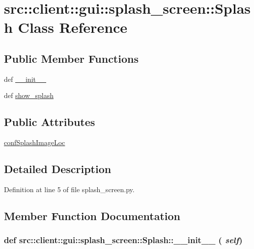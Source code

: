 \hypertarget{classsrc_1_1client_1_1gui_1_1splash__screen_1_1Splash}{
\section{src::client::gui::splash\_\-screen::Splash Class Reference}
\label{classsrc_1_1client_1_1gui_1_1splash__screen_1_1Splash}
}
\subsection*{Public Member Functions}
\begin{DoxyCompactItemize}
\item 
def \hyperlink{classsrc_1_1client_1_1gui_1_1splash__screen_1_1Splash_a7ee9da3537bacf46f1953552c201354f}{\_\-\_\-init\_\-\_\-}
\item 
def \hyperlink{classsrc_1_1client_1_1gui_1_1splash__screen_1_1Splash_a1ecaba75b7d19bf95c44f9fb2dd71cf1}{show\_\-splash}
\end{DoxyCompactItemize}
\subsection*{Public Attributes}
\begin{DoxyCompactItemize}
\item 
\hyperlink{classsrc_1_1client_1_1gui_1_1splash__screen_1_1Splash_aed0559e54d58963a7e91980faec90891}{confSplashImageLoc}
\end{DoxyCompactItemize}


\subsection{Detailed Description}


Definition at line 5 of file splash\_\-screen.py.



\subsection{Member Function Documentation}
\hypertarget{classsrc_1_1client_1_1gui_1_1splash__screen_1_1Splash_a7ee9da3537bacf46f1953552c201354f}{
\subsubsection[{\_\-\_\-init\_\-\_\-}]{\setlength{\rightskip}{0pt plus 5cm}def src::client::gui::splash\_\-screen::Splash::\_\-\_\-init\_\-\_\- ( {\em self})}}
\label{classsrc_1_1client_1_1gui_1_1splash__screen_1_1Splash_a7ee9da3537bacf46f1953552c201354f}


